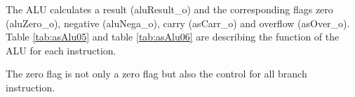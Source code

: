 The ALU calculates a result (aluResult\_o) and the corresponding flags zero (aluZero\_o), negative (aluNega\_o), carry (asCarr\_o) and overflow (asOver\_o). Table \ref{tab:asAlu05} and table \ref{tab:asAlu06} are describing the function of the ALU for each instruction.

The zero flag is not only a zero flag but also the control for all branch instruction.

